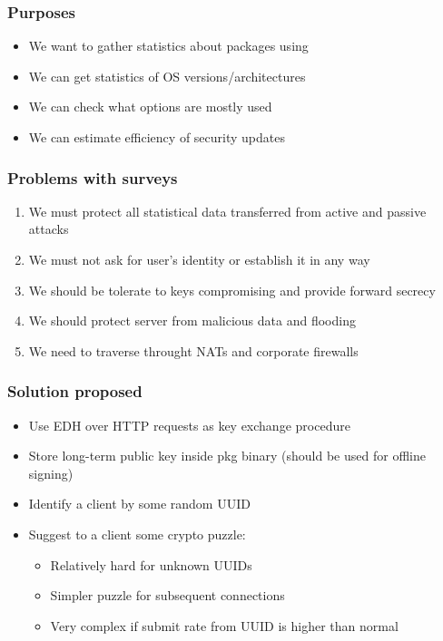 \documentclass{beamer}
\begin{document}
\begin{frame}
\frametitle{Purposes}
\begin{itemize}
  \item We want to gather statistics about packages using
  \item We can get statistics of OS versions/architectures
  \item We can check what options are mostly used
  \item We can estimate efficiency of security updates
\end{itemize}
\end{frame}

\begin{frame}
\frametitle{Problems with surveys}
\begin{enumerate}
  \item We must protect all statistical data transferred from active and passive
  attacks
  \item We must not ask for user's identity or establish it in any way
  \item We should be tolerate to keys compromising and provide forward secrecy
  \item We should protect server from malicious data and flooding
  \item We need to traverse throught NATs and corporate firewalls
\end{enumerate}
\end{frame}

\begin{frame}
\frametitle{Solution proposed}
\begin{itemize}
  \item Use EDH over HTTP requests as key exchange procedure
  \item Store long-term public key inside pkg binary (should be used for
  offline signing)
  \item Identify a client by some random UUID
  \item Suggest to a client some crypto puzzle:
  \begin{itemize}
    \item Relatively hard for unknown UUIDs
    \item Simpler puzzle for subsequent connections
    \item Very complex if submit rate from UUID is higher than normal 
  \end{itemize}
\end{itemize}
\end{frame}
\end{document}
